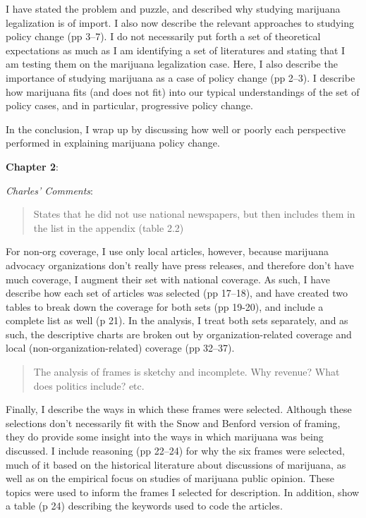 \documentclass[12pt,stdletter,dateno,sigleft]{newlfm} %
\begin{document}
\begin{newlfm}
I have stated the problem and puzzle, and described why studying marijuana legalization is of import. I also now describe the relevant approaches to studying policy change (pp 3--7). I do not necessarily put forth a set of theoretical expectations as much as I am identifying a set of literatures and stating that I am testing them on the marijuana legalization case. Here, I also describe the importance of studying marijuana as a case of policy change (pp 2--3). I describe how marijuana fits (and does not fit) into our typical understandings of the set of policy cases, and in particular, progressive policy change. 

In the conclusion, I wrap up by discussing how well or poorly each perspective performed in explaining marijuana policy change. \newline



\textbf{Chapter 2}:

\textit{Charles' Comments}:






\begin{quotation}{\color{red}\noindent \footnotesize
States that he did not use national newspapers, but then includes them in the list in the appendix (table 2.2)
}
\end{quotation}


For non-org coverage, I use only local articles, however, because marijuana advocacy organizations don't really have press releases, and therefore don't have much coverage, I augment their set with national coverage. As such, I have describe how each set of articles was selected (pp 17--18), and have created two tables to break down the coverage for both sets (pp 19-20), and include a complete list as well (p 21). In the analysis, I treat both sets separately, and as such, the descriptive charts are broken out by organization-related coverage and local (non-organization-related) coverage (pp 32--37).



\begin{quotation}{\color{red}\noindent \footnotesize
The analysis of frames is sketchy and incomplete. Why revenue? What does politics include? etc.
}
\end{quotation}


Finally, I describe the ways in which these frames were selected. Although these selections don't necessarily fit with the Snow and Benford version of framing, they do provide some insight into the ways in which marijuana was being discussed. I include reasoning (pp 22--24) for why the six frames were selected, much of it based on the historical literature about discussions of marijuana, as well as on the empirical focus on studies of marijuana public opinion. These topics were used to inform the frames I selected for description. In addition, show a table (p 24) describing the keywords used to code the articles. 



\end{newlfm}
\end{document}
